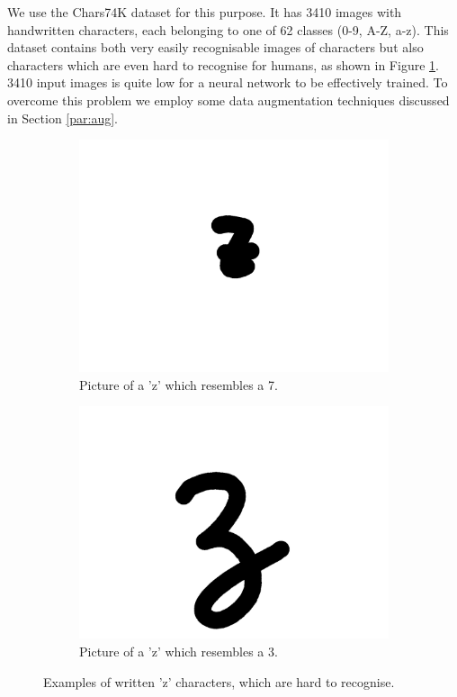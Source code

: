 \documentclass{article}
\begin{document}
We use the Chars74K dataset for this purpose. It has 3410 images with handwritten characters, each belonging to one of 62 classes (0-9, A-Z, a-z). 
This dataset contains both very easily recognisable images of characters but also characters which are even hard to recognise for humans, as shown in Figure \ref{fig:char}. 
3410 input images is quite low for a neural network to be effectively trained. To overcome this problem we employ some data augmentation techniques discussed in Section \ref{par:aug}. 

\begin{figure}
\begin{subfigure}{.23\textwidth}
  \centering
  \includegraphics[width=\linewidth]{images/bad_char1}
  \caption{Picture of a 'z' which resembles a 7.}
\end{subfigure}
\begin{subfigure}{.23\textwidth}
  \centering
  \includegraphics[width=\linewidth]{images/bad_char2}
  \caption{Picture of a 'z' which resembles a 3.}
\end{subfigure}
\caption{Examples of written 'z' characters, which are hard to recognise.}
\label{fig:char}
\end{figure}
\end{document}
